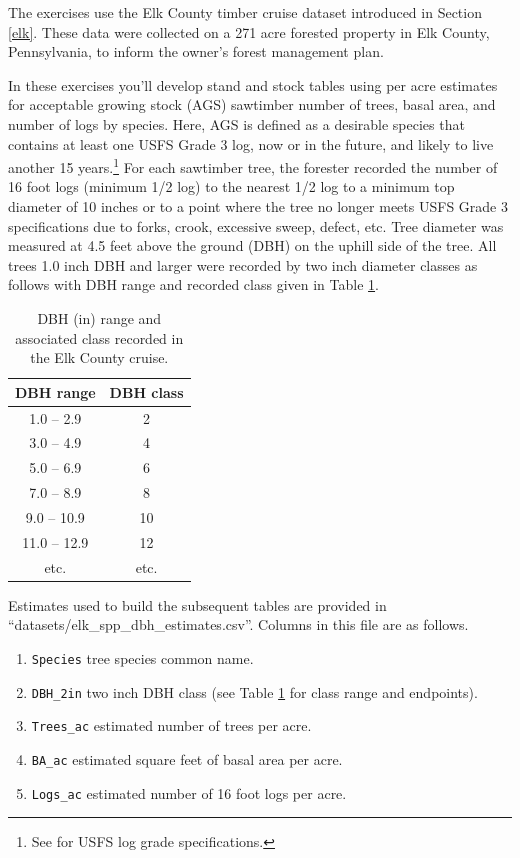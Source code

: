 \documentclass[
  11pt,
]{krantz}
\providecommand{\tightlist}{%
  \setlength{\itemsep}{0pt}\setlength{\parskip}{0pt}}
\theoremstyle{definition}
\theoremstyle{definition}
\theoremstyle{definition}
\theoremstyle{definition}
\theoremstyle{remark}
\begin{document}
The exercises use the Elk County timber cruise dataset introduced in Section \ref{elk}. These data were collected on a 271 acre forested property in Elk County, Pennsylvania, to inform the owner's forest management plan.

In these exercises you'll develop stand and stock tables using per acre estimates for acceptable growing stock (AGS) sawtimber number of trees, basal area, and number of logs by species. Here, AGS is defined as a desirable species that contains at least one USFS Grade 3 log, now or in the future, and likely to live another 15 years.\footnote{See \citet{hanks1976} for USFS log grade specifications.} For each sawtimber tree, the forester recorded the number of 16 foot logs (minimum 1/2 log) to the nearest 1/2 log to a minimum top diameter of 10 inches or to a point where the tree no longer meets USFS Grade 3 specifications due to forks, crook, excessive sweep, defect, etc. Tree diameter was measured at 4.5 feet above the ground (DBH) on the uphill side of the tree. All trees 1.0 inch DBH and larger were recorded by two inch diameter classes as follows with DBH range and recorded class given in Table \ref{tab:elkDBHClass}.

\begin{table}[!h]

\caption{\label{tab:elkDBHClass}DBH (in) range and associated class recorded in the Elk County cruise.}
\centering
\begin{tabular}[t]{cc}
\toprule
DBH range & DBH class\\
\midrule
1.0 – 2.9 & 2\\
3.0 – 4.9 & 4\\
5.0 – 6.9 & 6\\
7.0 – 8.9 & 8\\
9.0 – 10.9 & 10\\
11.0 – 12.9 & 12\\
etc. & etc.\\
\bottomrule
\end{tabular}
\end{table}

Estimates used to build the subsequent tables are provided in ``datasets/elk\_spp\_dbh\_estimates.csv''. Columns in this file are as follows.

\begin{enumerate}
\def\labelenumi{\arabic{enumi}.}
\tightlist
\item
  \texttt{Species} tree species common name.
\item
  \texttt{DBH\_2in} two inch DBH class (see Table \ref{tab:elkDBHClass} for class range and endpoints).
\item
  \texttt{Trees\_ac} estimated number of trees per acre.
\item
  \texttt{BA\_ac} estimated square feet of basal area per acre.
\item
  \texttt{Logs\_ac} estimated number of 16 foot logs per acre.
\end{enumerate}
\end{document}
